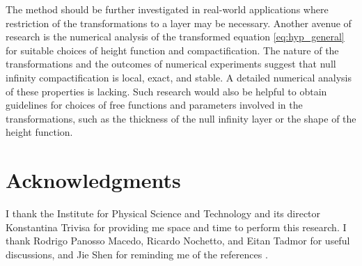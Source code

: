 \documentclass[final,onefignum,onetabnum]{siamart190516}
\begin{document}
The method should be further investigated in real-world applications where restriction of the transformations to a layer may be necessary. Another avenue of research is the numerical analysis of the transformed equation \eqref{eq:hyp_general} for suitable choices of height function and compactification. The nature of the transformations and the outcomes of numerical experiments suggest that null infinity compactification is local, exact, and stable. A detailed numerical analysis of these properties is lacking. Such research would also be helpful to obtain guidelines for choices of free functions and parameters involved in the transformations, such as the thickness of the null infinity layer or the shape of the height function.

\vspace{-7mm}

\section*{Acknowledgments}
I thank the Institute for Physical Science and Technology and its director Konstantina Trivisa for providing me space and time to perform this research. I thank Rodrigo Panosso Macedo, Ricardo Nochetto, and Eitan Tadmor for useful discussions, and Jie Shen for reminding me of the references \cite{wang2017perfect, yang2021truly}. 

\pagebreak

%


\end{document}
